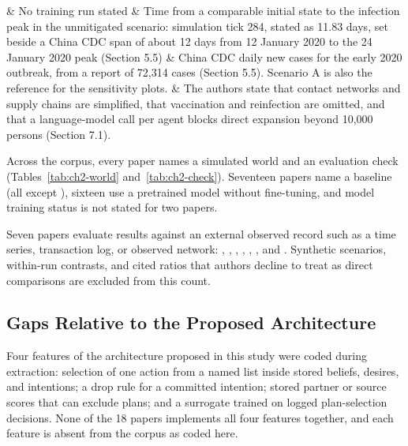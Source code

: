 \documentclass{icsthesis}
\begin{document}
\begin{mainmatter}
\begin{longtable}[l]
			\citet{Wang2026} & No training run stated & Time from a comparable initial state to the infection peak in the unmitigated scenario: simulation tick 284, stated as 11.83 days, set beside a China CDC span of about 12 days from 12 January 2020 to the 24 January 2020 peak (Section 5.5) & China CDC daily new cases for the early 2020 outbreak, from a report of 72,314 cases (Section 5.5). Scenario A is also the reference for the sensitivity plots. & The authors state that contact networks and supply chains are simplified, that vaccination and reinfection are omitted, and that a language-model call per agent blocks direct expansion beyond 10,000 persons (Section 7.1). \\
			\end{longtable}
			\endgroup

			Across the corpus, every paper names a simulated world and an evaluation check (Tables~\ref{tab:ch2-world} and~\ref{tab:ch2-check}). Seventeen papers name a baseline (all except \citealp{Asaf2025}), sixteen use a pretrained model without fine-tuning, and model training status is not stated for two papers.

			Seven papers evaluate results against an external observed record such as a time series, transaction log, or observed network: \citet{Chopra2025}, \citet{Gao2026}, \citet{JiangY2026}, \citet{Li2024}, \citet{Phan2026}, \citet{Sashihara2025}, and \citet{Wang2026}. Synthetic scenarios, within-run contrasts, and cited ratios that authors decline to treat as direct comparisons are excluded from this count.

			\subsection{Gaps Relative to the Proposed Architecture}

			Four features of the architecture proposed in this study were coded during extraction: selection of one action from a named list inside stored beliefs, desires, and intentions; a drop rule for a committed intention; stored partner or source scores that can exclude plans; and a surrogate trained on logged plan-selection decisions. None of the 18 papers implements all four features together, and each feature is absent from the corpus as coded here.


\end{mainmatter}
\end{document}
